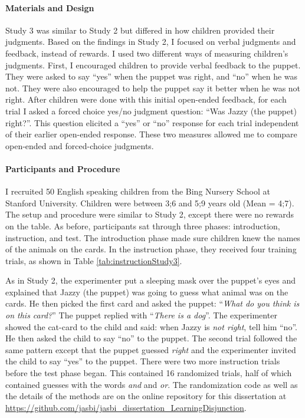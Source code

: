 \documentclass[man]{apa6}
\theoremstyle{definition}
\theoremstyle{definition}
\theoremstyle{definition}
\theoremstyle{remark}
\begin{document}
\paragraph{Materials and Design}\label{materials-and-design-2}

Study 3 was similar to Study 2 but differed in how children provided
their judgments. Based on the findings in Study 2, I focused on verbal
judgments and feedback, instead of rewards. I used two different ways of
measuring children's judgments. First, I encouraged children to provide
verbal feedback to the puppet. They were asked to say \enquote{yes} when
the puppet was right, and \enquote{no} when he was not. They were also
encouraged to help the puppet say it better when he was not right. After
children were done with this initial open-ended feedback, for each trial
I asked a forced choice yes/no judgment question: \enquote{Was Jazzy
(the puppet) right?}. This question elicited a \enquote{yes} or
\enquote{no} response for each trial independent of their earlier
open-ended response. These two measures allowed me to compare open-ended
and forced-choice judgments.

\paragraph{Participants and
Procedure}\label{participants-and-procedure-2}

I recruited 50 English speaking children from the Bing Nursery School at
Stanford University. Children were between 3;6 and 5;9 years old (Mean =
4;7). The setup and procedure were similar to Study 2, except there were
no rewards on the table. As before, participants sat through three
phases: introduction, instruction, and test. The introduction phase made
sure children knew the names of the animals on the cards. In the
instruction phase, they received four training trials, as shown in Table
\ref{tab:instructionStudy3}.

As in Study 2, the experimenter put a sleeping mask over the puppet's
eyes and explained that Jazzy (the puppet) was going to guess what
animal was on the cards. He then picked the first card and asked the
puppet: \enquote{\emph{What do you think is on this card?}} The puppet
replied with \enquote{\emph{There is a dog}}. The experimenter showed
the cat-card to the child and said: when Jazzy is \emph{not right}, tell
him \enquote{no}. He then asked the child to say \enquote{no} to the
puppet. The second trial followed the same pattern except that the
puppet guessed \emph{right} and the experimenter invited the child to
say \enquote{yes} to the puppet. There were two more instruction trials
before the test phase began. This contained 16 randomized trials, half
of which contained guesses with the words \emph{and} and \emph{or}. The
randomization code as well as the details of the methods are on the
online repository for this dissertation at
\href{https://github.com/jasbi/jasbi_dissertation_LearningDisjunction/blob/master/connective_comprehension/study3/0_methods/children}{https://github.com/jasbi/jasbi\_dissertation\_LearningDisjunction}.
\end{document}
